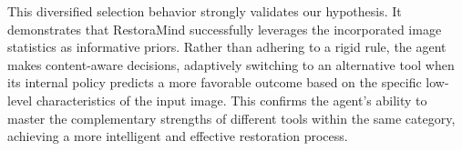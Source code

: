 This diversified selection behavior strongly validates our hypothesis. It demonstrates that RestoraMind successfully leverages the incorporated image statistics as informative priors. Rather than adhering to a rigid rule, the agent makes content-aware decisions, adaptively switching to an alternative tool when its internal policy predicts a more favorable outcome based on the specific low-level characteristics of the input image. This confirms the agent's ability to master the complementary strengths of different tools within the same category, achieving a more intelligent and effective restoration process.












